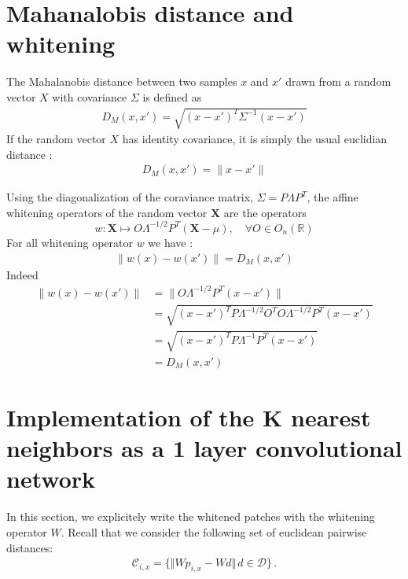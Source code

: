 \documentclass{article}
\begin{document}

{}

\newpage

\appendix

\section{Mahanalobis distance and whitening}

The Mahalanobis distance \citep{chandra1936generalised, mclachlan1999mahalanobis} between two samples $x$ and $x'$ drawn from a random vector $X$ with covariance $\Sigma$ is defined as  
\begin{align*} D_M (x, x' ) =  \sqrt{ (x - x')^T \Sigma^{-1} (x - x')} \end{align*}
If the random vector $X$ has identity covariance, it is simply the usual euclidian distance :
\begin{align*} D_M (x, x' ) =  \| x - x' \| \end{align*}

Using the diagonalization of the coraviance matrix,  $\Sigma = P\Lambda P^T$, the affine whitening operators of the random vector $\mathbf{X}$ are the operators 
\begin{equation}
\label{whitening}
     w : \mathbf{X} \mapsto O \Lambda^{-1/2} P^T (\mathbf{X} - \mu), \quad \forall O \in  O_n (\mathbb{R})
\end{equation}
For all whitening operator $w$ we have :
\begin{align*}
\|w(x) - w(x')\| = D_M(x, x')
\end{align*}
Indeed 
\begin{align*}
  \|w(x) - w(x')\|
    &= \| O \Lambda^{-1/2} P^T ( x - x') \|\\
    &= \sqrt{(x - x')^T P \Lambda^{-1/2} O^T O \Lambda^{-1/2} P^T (x - x') }\\
    &=  \sqrt{ (x - x')^T P \Lambda^{-1} P^T (x - x')} \\
    &= D_M(x, x') 
\end{align*}

\section{Implementation of the K nearest neighbors as a 1 layer convolutional network}

In this section, we explicitely write the whitened patches with the whitening operator $W$.
Recall that  we consider the following set of euclidean pairwise distances:
\begin{align*}\mathcal{C}_{i, x} =\{\Vert W p_{i, x} - W d \Vert\, d\in\mathcal{D} \}\,.\end{align*}
\end{document}
